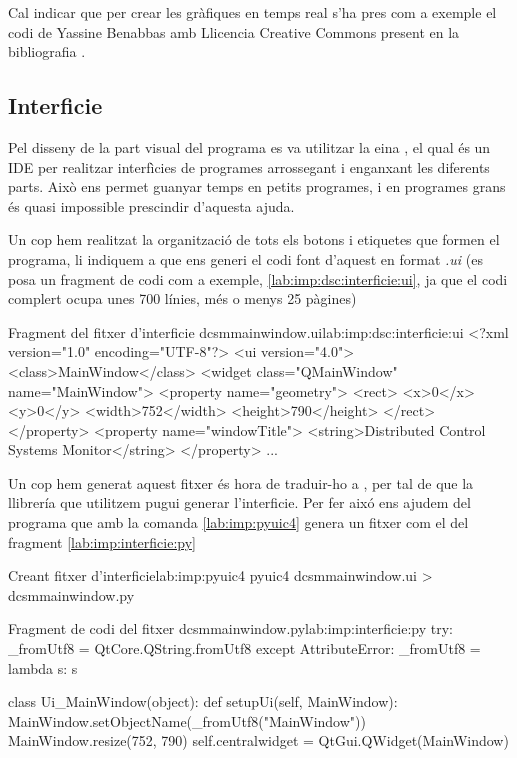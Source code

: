 Cal indicar que per crear les gràfiques en temps real s'ha pres com a exemple el codi de Yassine Benabbas amb Llicencia Creative Commons present en la bibliografia \cite[Creér un graphe dynamique avec PyPlot]{yassine}.

\subsection{Interficie}\label{cap:imp:visual}

Pel disseny de la part visual del programa es va utilitzar la eina \QTCreator, el qual és un IDE per realitzar interfìcies de programes arrossegant i enganxant les diferents parts. Això ens permet guanyar temps en petits programes, i en programes grans és quasi impossible prescindir d'aquesta ajuda.

Un cop hem realitzat la organització de tots els botons i etiquetes que formen el programa, li indiquem a \QTCreator que ens generi el codi font d'aquest en format \textit{.ui} (es posa un fragment de codi com a exemple, \ref{lab:imp:dsc:interficie:ui}, ja que el codi complert ocupa unes 700 línies, més o menys 25 pàgines)

\begin{code_xml}{Fragment del fitxer d'interficie dcsmmainwindow.ui}{lab:imp:dsc:interficie:ui}
<?xml version="1.0" encoding="UTF-8"?>
<ui version="4.0">
 <class>MainWindow</class>
 <widget class="QMainWindow" name="MainWindow">
  <property name="geometry">
   <rect>
    <x>0</x>
    <y>0</y>
    <width>752</width>
    <height>790</height>
   </rect>
  </property>
  <property name="windowTitle">
   <string>Distributed Control Systems Monitor</string>
  </property>
     ...
\end{code_xml}

Un cop hem generat aquest fitxer és hora de traduir-ho a \Python, per tal de que la llibrería que utilitzem \PyQT pugui generar l'interficie. Per fer aixó ens ajudem del programa \pyuic que amb la comanda \ref{lab:imp:pyuic4} genera un fitxer com el del fragment \ref{lab:imp:interficie:py}

\begin{code_bash}{Creant fitxer d'interficie}{lab:imp:pyuic4}
pyuic4 dcsmmainwindow.ui > dcsmmainwindow.py
\end{code_bash}

\begin{code_python}{Fragment de codi del fitxer dcsmmainwindow.py}{lab:imp:interficie:py}
try:
    _fromUtf8 = QtCore.QString.fromUtf8
except AttributeError:
    _fromUtf8 = lambda s: s

class Ui_MainWindow(object):
    def setupUi(self, MainWindow):
        MainWindow.setObjectName(_fromUtf8("MainWindow"))
        MainWindow.resize(752, 790)
        self.centralwidget = QtGui.QWidget(MainWindow)
\end{code_python}

